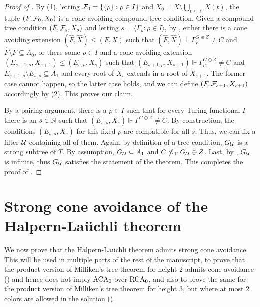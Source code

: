 \begin{proof}[Proof of ]
By (1), letting $\mathcal{F}_0 = \{ \{\rho \}: \rho \in I\}$ and $X_0 = X \setminus \bigcup_{t \leq \ell} X(t)$, the tuple $(F, \mathcal{F}_0, X_0)$ is a cone avoiding compound tree condition. Given a compound tree condition $(F, \mathcal{F}_s, X_s)$ and letting $s = \langle \Gamma_\rho: \rho \in I \rangle$, by ,
either there is a cone avoiding extension $(\hat{F}, \hat{X}) \leq (F, X)$
	such that $(\hat{F}, \hat{X}) \Vdash \Gamma^{G \oplus Z}_F \neq C$ and $\hat{F} \setminus F \subseteq A_0$, or there some $\rho \in I$ and a cone avoiding extension $(E_{s+1,\rho}, X_{s+1}) \leq (E_{s,\rho}, X_s)$
	such that $(E_{s+1, \rho}, X_{s+1}) \Vdash \Gamma_\rho^{G \oplus Z} \neq C$ and $E_{s+1,\rho}  \setminus E_{s,\rho} \subseteq A_1$ and every root of $X_s$ extends in a root of $X_{s+1}$. The former case cannot happen, so the latter case holds, and we can define $(F, \mathcal{F}_{s+1}, X_{s+1})$ accordingly by (2). This proves our claim.

By a pairing argument, there is a $\rho \in I$ such that for every Turing functional $\Gamma$ there is an $s \in \mathbb{N}$ such that $(E_{s,\rho}, X_s) \Vdash \Gamma^{G \oplus Z} \neq C$. By construction, the conditions $(E_{s,\rho}, X_s)$ for this fixed $\rho$ are compatible for all $s$. Thus, we can fix a filter $\mathcal{U}$ containing all of them.
Again, by definition of a tree condition, $G_{\mathcal{U}}$ is a strong subtree of $T$. By assumption, $G_{\mathcal{U}} \subseteq A_1$ and $C \nleq_{\text{\upshape T}} G_{\mathcal{U}} \oplus Z$.
Last, by , $G_{\mathcal{U}}$ is infinite, thus $G_{\mathcal{U}}$ satisfies the statement of the theorem. This completes the proof of .
\end{proof}

\section{Strong cone avoidance of the Halpern-La\"{u}chli theorem}\label{sec:sca_hl}

We now prove that the Halpern-La\"{u}chli theorem admits strong cone avoidance. This will be used in multiple parts of the rest of the manuscript, to prove that the product version of Milliken's tree theorem for height 2 admits cone avoidance () and hence does not imply $\mathrm{ACA}_0$ over $\mathrm{RCA}_0$, and also to prove the same for the product version of Milliken's tree theorem for height 3, but where at most 2 colors are allowed in the solution ().

